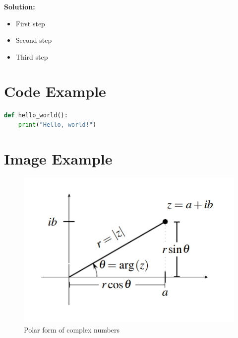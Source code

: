 \documentclass{article}
\theoremstyle{problemstyle}
\begin{document}
\textbf{Solution:}
\begin{itemize}[label={},leftmargin=1.25cm,nosep]
    \item First step
    \item Second step
    \item Third step
\end{itemize}


\section{Code Example}

\begin{lstlisting}[language=Python, caption={Example Code Block}]
def hello_world():
    print("Hello, world!")
\end{lstlisting}

\section{Image Example}

\begin{figure}[H]
    \centering
    \includegraphics{../!assets/MATH1021-003-fig1.png}
    \caption{Polar form of complex numbers}
\end{figure}
\end{document}
